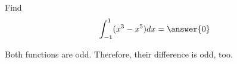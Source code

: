 \documentclass{ximera}
\author{Gregory Hartman \and Matthew Carr\and Nela Lakos}
\begin{document}
\begin{exercise}

Find
\[
\int_{-1}^{1}(x^3-x^5) dx=\answer{0}
\]
\begin{hint}
Both functions are odd. Therefore, their difference is odd, too.
\end{hint}
\end{exercise}
\end{document}

